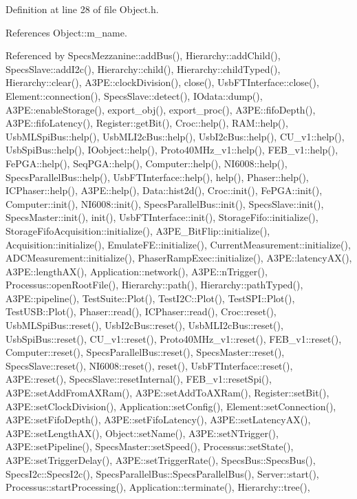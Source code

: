 Definition at line 28 of file Object.\+h.



References Object\+::m\+\_\+name.



Referenced by Specs\+Mezzanine\+::add\+Bus(), Hierarchy\+::add\+Child(), Specs\+Slave\+::add\+I2c(), Hierarchy\+::child(), Hierarchy\+::child\+Typed(), Hierarchy\+::clear(), A3\+P\+E\+::clock\+Division(), close(), Usb\+F\+T\+Interface\+::close(), Element\+::connection(), Specs\+Slave\+::detect(), I\+Odata\+::dump(), A3\+P\+E\+::enable\+Storage(), export\+\_\+obj(), export\+\_\+proc(), A3\+P\+E\+::fifo\+Depth(), A3\+P\+E\+::fifo\+Latency(), Register\+::get\+Bit(), Croc\+::help(), R\+A\+M\+::help(), Usb\+M\+L\+Spi\+Bus\+::help(), Usb\+M\+L\+I2c\+Bus\+::help(), Usb\+I2c\+Bus\+::help(), C\+U\+\_\+v1\+::help(), Usb\+Spi\+Bus\+::help(), I\+Oobject\+::help(), Proto40\+M\+Hz\+\_\+v1\+::help(), F\+E\+B\+\_\+v1\+::help(), Fe\+P\+G\+A\+::help(), Seq\+P\+G\+A\+::help(), Computer\+::help(), N\+I6008\+::help(), Specs\+Parallel\+Bus\+::help(), Usb\+F\+T\+Interface\+::help(), help(), Phaser\+::help(), I\+C\+Phaser\+::help(), A3\+P\+E\+::help(), Data\+::hist2d(), Croc\+::init(), Fe\+P\+G\+A\+::init(), Computer\+::init(), N\+I6008\+::init(), Specs\+Parallel\+Bus\+::init(), Specs\+Slave\+::init(), Specs\+Master\+::init(), init(), Usb\+F\+T\+Interface\+::init(), Storage\+Fifo\+::initialize(), Storage\+Fifo\+Acquisition\+::initialize(), A3\+P\+E\+\_\+\+Bit\+Flip\+::initialize(), Acquisition\+::initialize(), Emulate\+F\+E\+::initialize(), Current\+Measurement\+::initialize(), A\+D\+C\+Measurement\+::initialize(), Phaser\+Ramp\+Exec\+::initialize(), A3\+P\+E\+::latency\+A\+X(), A3\+P\+E\+::length\+A\+X(), Application\+::network(), A3\+P\+E\+::n\+Trigger(), Processus\+::open\+Root\+File(), Hierarchy\+::path(), Hierarchy\+::path\+Typed(), A3\+P\+E\+::pipeline(), Test\+Suite\+::\+Plot(), Test\+I2\+C\+::\+Plot(), Test\+S\+P\+I\+::\+Plot(), Test\+U\+S\+B\+::\+Plot(), Phaser\+::read(), I\+C\+Phaser\+::read(), Croc\+::reset(), Usb\+M\+L\+Spi\+Bus\+::reset(), Usb\+I2c\+Bus\+::reset(), Usb\+M\+L\+I2c\+Bus\+::reset(), Usb\+Spi\+Bus\+::reset(), C\+U\+\_\+v1\+::reset(), Proto40\+M\+Hz\+\_\+v1\+::reset(), F\+E\+B\+\_\+v1\+::reset(), Computer\+::reset(), Specs\+Parallel\+Bus\+::reset(), Specs\+Master\+::reset(), Specs\+Slave\+::reset(), N\+I6008\+::reset(), reset(), Usb\+F\+T\+Interface\+::reset(), A3\+P\+E\+::reset(), Specs\+Slave\+::reset\+Internal(), F\+E\+B\+\_\+v1\+::reset\+Spi(), A3\+P\+E\+::set\+Add\+From\+A\+X\+Ram(), A3\+P\+E\+::set\+Add\+To\+A\+X\+Ram(), Register\+::set\+Bit(), A3\+P\+E\+::set\+Clock\+Division(), Application\+::set\+Config(), Element\+::set\+Connection(), A3\+P\+E\+::set\+Fifo\+Depth(), A3\+P\+E\+::set\+Fifo\+Latency(), A3\+P\+E\+::set\+Latency\+A\+X(), A3\+P\+E\+::set\+Length\+A\+X(), Object\+::set\+Name(), A3\+P\+E\+::set\+N\+Trigger(), A3\+P\+E\+::set\+Pipeline(), Specs\+Master\+::set\+Speed(), Processus\+::set\+State(), A3\+P\+E\+::set\+Trigger\+Delay(), A3\+P\+E\+::set\+Trigger\+Rate(), Specs\+Bus\+::\+Specs\+Bus(), Specs\+I2c\+::\+Specs\+I2c(), Specs\+Parallel\+Bus\+::\+Specs\+Parallel\+Bus(), Server\+::start(), Processus\+::start\+Processing(), Application\+::terminate(), Hierarchy\+::tree(), 